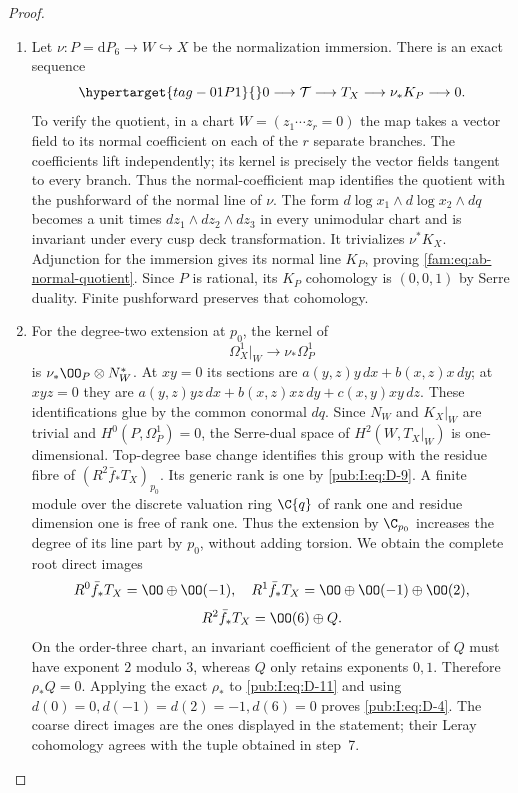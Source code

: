 \begin{proof}
\begin{enumerate}[label=\arabic*.,leftmargin=*]
\begin{enumerate}[label=(\alph*),leftmargin=*]
\item Let $\nu:P=\mathrm dP_6\to W\hookrightarrow X$ be the normalization
immersion. There is an exact sequence
\begin{equation}
 \hypertarget{tag-01P1}{}\label{fam:eq:ab-normal-quotient}
0\longrightarrow\mathcal T\longrightarrow T_X
 \longrightarrow\nu_*K_P\longrightarrow0.             
\end{equation}
To verify the quotient, in a chart $W=(z_1\cdots z_r=0)$ the map takes
a vector field to its normal coefficient on each of the $r$ separate
branches. The coefficients lift independently; its kernel is precisely
the vector fields tangent to every branch. Thus the normal-coefficient map identifies the quotient with
the pushforward of the normal line of $\nu$.
The form $d\log x_1\wedge d\log x_2\wedge dq$ becomes a unit times
$dz_1\wedge dz_2\wedge dz_3$ in every unimodular chart and is invariant
under every cusp deck transformation. It trivializes $\nu^*K_X$.
Adjunction for the immersion gives its normal line $K_P$, proving
\eqref{fam:eq:ab-normal-quotient}. Since $P$ is rational, its $K_P$ cohomology is $(0,0,1)$ by
Serre duality. Finite pushforward preserves that cohomology.

\item For the degree-two extension at $p_0$, the kernel of
\[
 \Omega_X^1|_W\longrightarrow\nu_*\Omega_P^1
\]
is $\nu_*\OO_P\otimes N_W^*$. At $xy=0$ its sections are
$a(y,z)y\,dx+b(x,z)x\,dy$; at $xyz=0$ they are
$a(y,z)yz\,dx+b(x,z)xz\,dy+c(x,y)xy\,dz$.
These identifications glue by the common conormal $dq$.
Since $N_W$ and $K_X|_W$ are trivial and $H^0(P,\Omega_P^1)=0$, the
Serre-dual space of $H^2(W,T_X|_W)$ is one-dimensional.
Top-degree base change identifies this group with the residue fibre
of $(R^2\bar f_*T_X)_{p_0}$. Its generic rank is one by \eqref{pub:I:eq:D-9}.
A finite module over the discrete valuation ring $\C\{q\}$ of rank
one and residue dimension one is free of rank one. Thus the extension
by $\C_{p_0}$ increases the degree of its line part by $p_0$, without
adding torsion. We obtain the complete root direct images
\[
 R^0\bar f_*T_X=\OO\oplus\OO(-1),\quad
 R^1\bar f_*T_X=\OO\oplus\OO(-1)\oplus\OO(2),
\]
\begin{equation}
 R^2\bar f_*T_X=\OO(6)\oplus Q.
\label{pub:I:eq:D-11}
\end{equation}
On the order-three chart, an invariant coefficient of the generator
of $Q$ must have exponent $2$ modulo $3$, whereas $Q$ only retains
exponents $0,1$. Therefore $\rho_*Q=0$. Applying the exact $\rho_*$
to \eqref{pub:I:eq:D-11} and using
$d(0)=0,d(-1)=d(2)=-1,d(6)=0$ proves \eqref{pub:I:eq:D-4}.
The coarse direct images are the ones displayed in the statement;
their Leray cohomology agrees with the tuple obtained in step~7.
\end{enumerate}
\end{enumerate}
\end{proof}